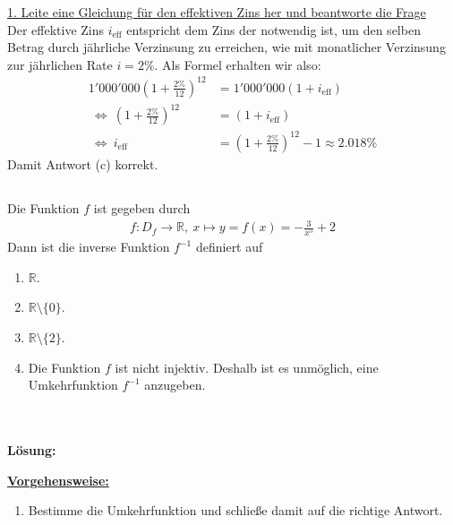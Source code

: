 \underline{1. Leite eine Gleichung für den effektiven Zins her und beantworte die Frage}\\
Der effektive Zins $ i_{\textrm{eff}} $ entspricht dem Zins der notwendig ist, um den selben Betrag durch jährliche Verzinsung zu erreichen, wie mit monatlicher Verzinsung zur jährlichen Rate $ i = 2 \% $.
Als Formel erhalten wir also:
\begin{align*}
1'000'000 \left( 1 + \frac{2 \%}{12}\right)^{12}
&=
1'000'000 (1 + i_{\mathrm{eff}})\\
\ \Leftrightarrow \
 \left( 1 + \frac{2 \%}{12}\right)^{12}
&=
 (1 + i_{\mathrm{eff}})\\
\ \Leftrightarrow \
i_{\mathrm{eff}}
&=
\left( 1 + \frac{2 \%}{12}\right)^{12} - 1
\approx 2.018 \%
\end{align*}
Damit Antwort (c) korrekt.

\newpage

\subsection*{}
Die Funktion $ f $ ist gegeben durch
\begin{align*}
f : D_f \to \mathbb{R}, \ 
x \mapsto y = f(x) = - \frac{3}{x^5} +2
\end{align*}
Dann ist die inverse Funktion $ f^{-1} $ definiert auf 
\renewcommand{\labelenumi}{(\alph{enumi})}
\begin{enumerate}
	\item 
	$ \mathbb{R} $.
	\item
	$ \mathbb{R} \setminus \lbrace 0 \rbrace $.
	\item
	$ \mathbb{R} \setminus \lbrace 2 \rbrace $.
	\item
	Die Funktion $ f $ ist nicht injektiv. Deshalb ist es unmöglich, eine Umkehrfunktion $ f^{-1} $ anzugeben.
\end{enumerate}
\ \\
\ \\
\textbf{Lösung:}
\begin{mdframed}
\underline{\textbf{Vorgehensweise:}}
\renewcommand{\labelenumi}{\theenumi.}
\begin{enumerate}
\item Bestimme die Umkehrfunktion und schließe damit auf die richtige Antwort.
\end{enumerate}
\end{mdframed}

